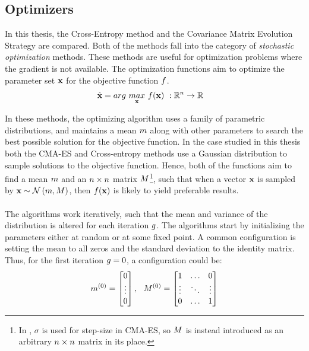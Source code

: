\subsection{Optimizers \label{Optimizers}}

In this thesis, the Cross-Entropy method and the Covariance Matrix Evolution 
Strategy are compared. Both of the methods fall into the category of 
\textit{stochastic optimization}
methods. These methods are useful for 
optimization problems where the gradient is not available.
The optimization functions aim to optimize 
the parameter set $\textbf{x}$
for the objective function $f$.
\begin{align}
\hat{\textbf{\individual }} &= 
arg \  \underset{\textbf{\individual }}{max} \  
\fitnessFunction (\textbf{\individual }) \ 
:\mathbb{R}^{\dimensions } \rightarrow \mathbb{R}
\end{align}

In these methods, the optimizing algorithm uses a family of parametric distributions,
and maintains a mean $m $ along with other parameters
to search the best possible solution for the objective function.  
In the case studied in this thesis
both the CMA-ES and Cross-entropy methods use a 
Gaussian distribution to sample solutions to the objective function.
Hence, both of the functions aim to find a mean 
$m $ and an $n \times n$ matrix 
$M $\footnote{In \citep{hansen2011}, 
$\sigma$ is used for step-size in CMA-ES, so $M $ is instead introduced
as an arbitrary $n \times n$ matrix in its place.}, such that when
a vector $\textbf{x}$ is sampled by 
$\textbf{x} \sim \mathcal{N}\left( m, M \right)$, 
then $f (\textbf{x})$ 
is likely to yield preferable results.\\
\\
The algorithms work iteratively, such that the mean and variance 
of the distribution 
is altered for each iteration $g $.
The algorithms start by initializing the 
parameters either at random or at some fixed point. A common 
configuration is setting the mean to 
all zeros and the standard deviation to the identity matrix.
Thus, for the first iteration $g = 0$, a configuration could be:
\begin{align}
\mean^{(0)} =
\begin{bmatrix}
0\\
\vdots\\
0
\end{bmatrix},\ \ 
\varianceMatrix^{(0)} = 
\begin{bmatrix}
1 & \hdots & 0\\
\vdots & \ddots & \vdots\\
0 & \hdots & 1
\end{bmatrix}
\end{align}

